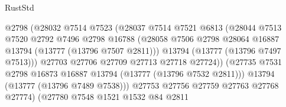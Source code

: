 \begin{lexlean}{RustStd}
\begin{coremodule}
                                        @2798
                                        (@28032
                                          @7514
                                          @7523
                                          (@28037
                                            @7514
                                            @7521
                                            @6813
                                            (@28044
                                              @7513
                                              @7520
                                              @2792
                                              @7496
                                              @2798
                                              @16788
                                              (@28058
                                                @7506
                                                @2798
                                                @28064
                                                @16887
                                                @13794
                                                (@13777 (@13796 @7507 @2811)))
                                              @13794
                                              (@13777 (@13796 @7497 @7513)))
                                            @27703
                                            @27706
                                            @27709
                                            @27713
                                            @27718
                                            @27724))
                                        (@27735
                                          @7531
                                          @2798
                                          @16873
                                          @16887
                                          @13794
                                          (@13777 (@13796 @7532 @2811)))
                                        @13794
                                        (@13777 (@13796 @7489 @7538)))
                                      @27753
                                      @27756
                                      @27759
                                      @27763
                                      @27768
                                      @27774)
                                    (@27780
                                      @7548
                                      @1521
                                      @1532
                                      @84
                                      @2811

\end{coremodule}
\end{lexlean}
